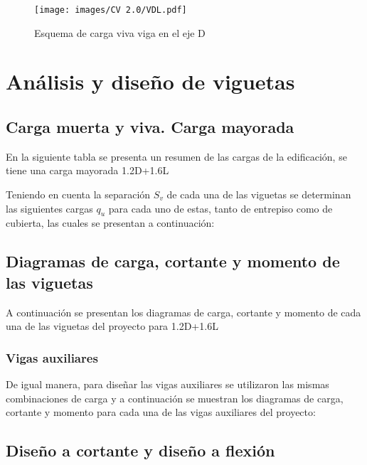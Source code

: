 \documentclass[12pt]{article}
\begin{document}
\begin{figure}[H]
    \centering
    \texttt{[image: images/CV 2.0/VDL.pdf]}
    \caption{Esquema de carga viva viga en el eje D}
    \label{fig:EsqVigaEjeDV}
\end{figure}
\newpage
\section{Análisis y diseño de viguetas}
\subsection{Carga muerta y viva. Carga mayorada}

En la siguiente tabla se presenta un resumen de las cargas de la edificación, se tiene una carga mayorada 1.2D+1.6L


Teniendo en cuenta la separación $S_{v}$ de cada una de las viguetas se determinan las siguientes cargas $q_{u}$ para cada uno de estas, tanto de entrepiso como de cubierta, las cuales se presentan a continuación:



\subsection{Diagramas de carga, cortante y momento de las viguetas}
A continuación se presentan los diagramas de carga, cortante y momento de cada una de las viguetas del proyecto para 1.2D+1.6L



\subsubsection{Vigas auxiliares}
De igual manera, para diseñar las vigas auxiliares se utilizaron las mismas combinaciones de carga y a continuación se muestran los diagramas de carga, cortante y momento para cada una de las vigas auxiliares del proyecto:



\newpage
\subsection{Diseño a cortante y diseño a flexión}
\end{document}
